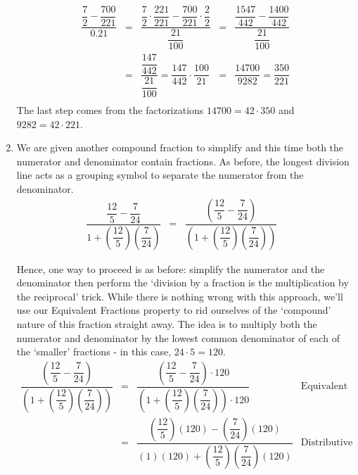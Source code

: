 \documentclass{ximera}
\begin{document}
\begin{example}
\begin{enumerate}
\[\begin{array}{rclcl}
\dfrac{\dfrac{7}{2}-\dfrac{700}{221}}{0.21} & = & \dfrac{\dfrac{7}{2}\cdot\dfrac{221}{221} - \dfrac{700}{221}\cdot\dfrac{2}{2}}{\dfrac{21}{100}} & = & \dfrac{\dfrac{1547}{442} -\dfrac{1400}{442}}{\dfrac{21}{100}} \\[10pt] 
		                                        & = & \dfrac{\dfrac{147}{442}}{\dfrac{21}{100}} = \dfrac{147}{442} \cdot \dfrac{100}{21} & = & \dfrac{14700}{9282} = \dfrac{350}{221} \\ \end{array}\] The last step comes from the factorizations $14700 = 42 \cdot 350$ and $9282 = 42 \cdot 221$.


\item We are given another compound fraction to simplify and this time both the numerator and denominator contain fractions.  As before, the longest division line acts as a grouping symbol to separate the numerator from the denominator.\[ \begin{array}{rclr}

\dfrac{\dfrac{12}{5} - \dfrac{7}{24}}{1 + \left(\dfrac{12}{5}\right) \left(\dfrac{7}{24}\right)} & = & \dfrac{\left(\dfrac{12}{5} - \dfrac{7}{24}\right)}{\left(1 + \left(\dfrac{12}{5}\right) \left(\dfrac{7}{24}\right)\right)} & \end{array} \] 

Hence, one way to proceed is as before: simplify the numerator and the denominator then perform the `division by a fraction is the multiplication by the reciprocal' trick.  While there is nothing wrong with this approach, we'll use our Equivalent Fractions property to rid ourselves of the `compound' nature of this fraction straight away.  The idea is to multiply both the numerator and denominator by the lowest common denominator of each of the `smaller' fractions - in this case, $24 \cdot 5 = 120$.\[ \begin{array}{rclr}

 \dfrac{\left(\dfrac{12}{5} - \dfrac{7}{24}\right)}{\left(1 + \left(\dfrac{12}{5}\right) \left(\dfrac{7}{24}\right)\right)} & = &\dfrac{\left(\dfrac{12}{5} - \dfrac{7}{24}\right) \cdot 120}{\left(1 + \left(\dfrac{12}{5}\right) \left(\dfrac{7}{24}\right)\right) \cdot 120} & \text{Equivalent Fractions}\\ [30pt]

& = & \dfrac{\left(\dfrac{12}{5}\right) (120) - \left(\dfrac{7}{24}\right) (120)}{(1)(120) + \left(\dfrac{12}{5}\right) \left(\dfrac{7}{24}\right)(120)} & \text{Distributive Property} \\[30pt]


\end{array}\]
\end{enumerate}
\end{example}
\end{document}
